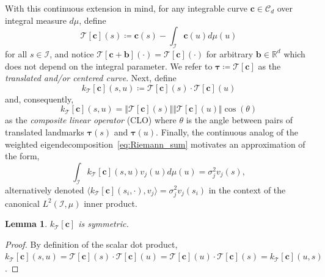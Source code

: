 \documentclass[pdflatex,iicol]{sn-jnl}%
\theoremstyle{thmstyleone}%
\newtheorem{lemma}{Lemma}%
\theoremstyle{thmstyletwo}%
\theoremstyle{thmstylethree}%
\begin{document}
With this continuous extension in mind, for any integrable curve $\boldsymbol{c} \in \mathcal{C}_d$ over integral measure $d\mu$, define 
\begin{equation}
    \mathcal{T}[\boldsymbol{c}](s) \coloneqq \boldsymbol{c}(s) - \int_{\mathcal{I}} \boldsymbol{c}(u)d\mu(u)
\end{equation} 
for all $s \in \mathcal{I}$, and notice $\mathcal{T}[\boldsymbol{c} +\boldsymbol{b}](\cdot) = \mathcal{T}[\boldsymbol{c}](\cdot)$ for arbitrary $\boldsymbol{b}\in \mathbb{R}^d$ which does not depend on the integral parameter. We refer to $\boldsymbol{\tau} \coloneqq \mathcal{T}[\boldsymbol{c}]$ as the \textit{translated and/or centered curve}. Next, define
\begin{equation}\label{eq:CLO}
    k_{\mathcal{T}}[\boldsymbol{c}](s,u) \coloneqq \mathcal{T}[\boldsymbol{c}](s) \cdot \mathcal{T}[\boldsymbol{c}](u)
\end{equation} 
and, consequently,
\begin{equation} \label{eq:inner_prod_ident}
    k_{\mathcal{T}}[\boldsymbol{c}](s,u) = \Vert \mathcal{T}[\boldsymbol{c}](s) \Vert \Vert \mathcal{T}[\boldsymbol{c}](u) \Vert \cos{(\theta)}
\end{equation}
as the \emph{composite linear operator} (CLO) where $\theta$ is the angle between pairs of translated landmarks $\boldsymbol{\tau}(s)$ and $\boldsymbol{\tau}(u)$. Finally, the continuous analog of the weighted eigendecomposition~\eqref{eq:Riemann_sum} motivates an approximation of the form,
\begin{equation} \label{eq:FIE}
    \int_{\mathcal{I}}k_{\mathcal{T}}[\boldsymbol{c}](s,u)v_j(u)d\mu(u) = \sigma_j^2v_j(s),
\end{equation}
alternatively denoted $\langle k_{\mathcal{T}}[\boldsymbol{c}](s_i,\cdot), v_j\rangle = \sigma_j^2v_j(s_i)$ in the context of the canonical $L^2(\mathcal{I},\mu)$ inner product.

\begin{lemma} \label{lemma:symm}
    $k_{\mathcal{T}}[\boldsymbol{c}]$ is symmetric.
\end{lemma}

\begin{proof}
    By definition of the scalar dot product, $k_{\mathcal{T}}[\boldsymbol{c}](s,u) = \mathcal{T}[\boldsymbol{c}](s) \cdot \mathcal{T}[\boldsymbol{c}](u) = \mathcal{T}[\boldsymbol{c}](u) \cdot \mathcal{T}[\boldsymbol{c}](s) = k_{\mathcal{T}}[\boldsymbol{c}](u,s)$.
\end{proof}
\end{document}

